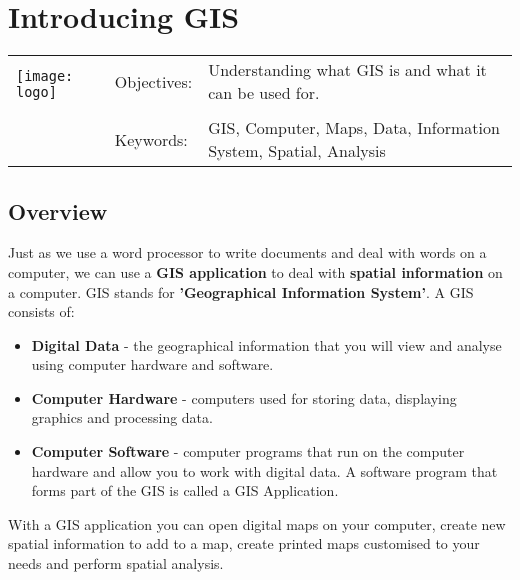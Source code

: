 
\setcounter{page}{1}
\setcounter{secnumdepth}{1} 



\section{Introducing GIS}\label{gis_intro}
\begin{tabular}{p{3.5cm}p{6cm}p{6cm}}
\multirow{2}{*}{\texttt{[image: logo]}} & Objectives: &
Understanding what GIS is and what it can be used for. \\ 
& & \\
& Keywords: & GIS, Computer, Maps, Data, Information System, Spatial,
Analysis \\
\hline
\end{tabular}

\subsection{Overview}

Just as we use a word processor to write documents and deal with words on a
computer, we can use a \textbf{GIS application} to deal with \textbf{spatial
information} on a computer. GIS stands for \textbf{'Geographical Information
System'}. A GIS consists of:

\begin{itemize}
\item \textbf{Digital Data} - the geographical information that you will view
and analyse using computer hardware and software.
\item \textbf{Computer Hardware} - computers used for storing data,
displaying graphics and processing data.
\item \textbf{Computer Software} - computer programs that run on the computer
hardware and allow you to work with digital data. A software program that
forms part of the GIS is called a GIS Application.
\end{itemize}

With a GIS application you can open digital maps on your computer, create new
spatial information to add to a map, create printed maps customised to your
needs and perform spatial analysis.


